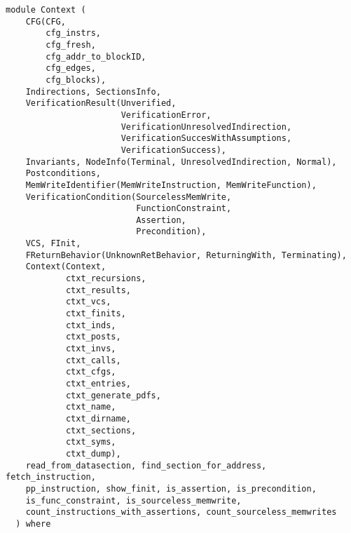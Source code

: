 \label{module:Context}
\haddockbeginheader
{\haddockverb\begin{verbatim}
module Context (
    CFG(CFG,
        cfg_instrs,
        cfg_fresh,
        cfg_addr_to_blockID,
        cfg_edges,
        cfg_blocks),
    Indirections, SectionsInfo,
    VerificationResult(Unverified,
                       VerificationError,
                       VerificationUnresolvedIndirection,
                       VerificationSuccesWithAssumptions,
                       VerificationSuccess),
    Invariants, NodeInfo(Terminal, UnresolvedIndirection, Normal),
    Postconditions,
    MemWriteIdentifier(MemWriteInstruction, MemWriteFunction),
    VerificationCondition(SourcelessMemWrite,
                          FunctionConstraint,
                          Assertion,
                          Precondition),
    VCS, FInit,
    FReturnBehavior(UnknownRetBehavior, ReturningWith, Terminating),
    Context(Context,
            ctxt_recursions,
            ctxt_results,
            ctxt_vcs,
            ctxt_finits,
            ctxt_inds,
            ctxt_posts,
            ctxt_invs,
            ctxt_calls,
            ctxt_cfgs,
            ctxt_entries,
            ctxt_generate_pdfs,
            ctxt_name,
            ctxt_dirname,
            ctxt_sections,
            ctxt_syms,
            ctxt_dump),
    read_from_datasection, find_section_for_address, fetch_instruction,
    pp_instruction, show_finit, is_assertion, is_precondition,
    is_func_constraint, is_sourceless_memwrite,
    count_instructions_with_assertions, count_sourceless_memwrites
  ) where\end{verbatim}}
\haddockendheader

